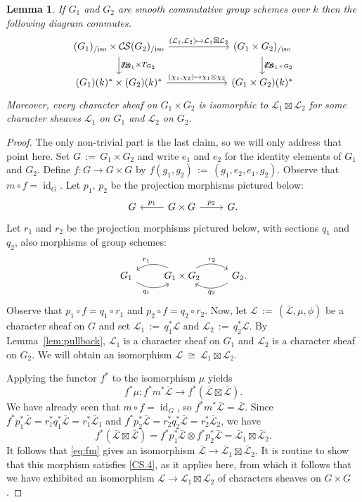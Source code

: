 \documentclass[10pt]{amsart}
\theoremstyle{plain}
\newtheorem{lemma}[theorem]{Lemma}
\theoremstyle{definition}
\newcommand{\Fq}{k}
\DeclareMathOperator{\id}{id}
\newcommand{\ceq}{{\, :=\, }}
\newcommand{\iso}{{\ \cong\ }}
\newcommand{\TrFrob}[1]{T_{#1}}
\newcommand{\cs}[1]{{\mathcal{#1}}}
\newcommand{\gcs}[1]{{\mathcal{\bar #1}}}
\newcommand{\CS}{{\mathcal{C\hskip-0.8pt S}}}
\newcommand{\CSiso}[1]{\CS(#1)_{/\text{iso}}}
\begin{document}
\begin{lemma}\label{lem:product}
If $G_1$ and $G_2$ are smooth commutative group schemes over $\Fq$ then the following diagram commutes.
\[
\begin{tikzcd}[column sep=60]
\arrow{d}{\TrFrob{G_1} \times \TrFrob{G_2}} \CSiso{G_1}\times \CSiso{G_2} \arrow{r}{(\cs{L}_1,\cs{L}_2)\mapsto \cs{L}_1\boxtimes \cs{L}_2}
& \arrow{d}{\TrFrob{G_1\times G_2}} \CSiso{G_1\times G_2}\\
(G_1)(\Fq)^*\times (G_2)(\Fq)^* \arrow{r}{(\chi_1,\chi_2)\mapsto \chi_1\otimes \chi_2}  & (G_1\times G_2)(\Fq)^*
\end{tikzcd}
\]
Moreover, every character sheaf on $G_1\times G_2$ is isomorphic to $\cs{L}_1\boxtimes\cs{L}_2$ for some character sheaves $\cs{L}_1$ on $G_1$ and $\cs{L}_2$ on $G_2$.
\end{lemma}
\begin{proof}
The only non-trivial part is the last claim, so we will only address that point here.
%
Set $G \ceq G_1\times G_2$
and write $e_1$ and $e_2$ for the identity elements of $G_1$ and $G_2$.
Define $f : G\to G\times G$ by $f(g_1,g_2) \ceq (g_1,e_2,e_1,g_2)$.
Observe that $m\circ f = \id_G$.
Let $p_1$, $p_2$ be the projection morphisms pictured below:
\[
\begin{tikzcd}
G & \arrow[swap]{l}{p_1} G\times G \arrow{r}{p_2} & G.
\end{tikzcd}
\]
Let $r_1$ and $r_2$ be the projection morphisms pictured below,
with sections $q_1$ and $q_2$, also morphisms of group schemes:
\[
\begin{tikzcd}
G_1  \arrow[swap, bend right]{r}{q_1} &
\arrow[swap, bend right]{l}{r_1} G_1\times G_2 \arrow[bend left]{r}{r_2} &
\arrow[bend left]{l}{q_2} G_2.
\end{tikzcd}
\]
Observe that $p_1\circ f = q_1 \circ r_1$ and $p_2 \circ f = q_2\circ r_2$.
%
Now, let $\cs{L} \ceq (\gcs{L},\mu,\phi)$ be a character sheaf on $G$
and set $\cs{L}_1 \ceq q_1^* \cs{L}$ and $\cs{L}_2 \ceq q_2^* \cs{L}$.
By Lemma~\ref{lem:pullback}, $\cs{L}_1$ is a character sheaf on $G_1$
and $\cs{L}_2$ is a character sheaf on $G_2$.
We will obtain an isomorphism $\cs{L} \iso  \cs{L}_1\boxtimes \cs{L}_2$.

Applying the functor $f^*$ to the isomorphism $\mu$ yields
\begin{equation}\label{eq:fm}
f^*\mu : f^* m^* \gcs{L} \to f^*(\gcs{L}\boxtimes \gcs{L}) .
\end{equation}
We have already seen that $m\circ f = \id_G$, so $f^* m^* \gcs{L} = \gcs{L}$.  
Since $f^*p_1^*\gcs{L} = r_1^* q_1^* \gcs{L} = r_1^* \gcs{L}_1$ and $f^*p_2^*\gcs{L} = r_2^* q_2^* \gcs{L} = r_2^*\gcs{L}_2$,
we have 
\[
f^*(\gcs{L}\boxtimes \gcs{L})  = f^*p_1^*\gcs{L}\otimes f^* p_2^*\gcs{L} = \gcs{L}_1\boxtimes \gcs{L}_2.
\]
It follows that \eqref{eq:fm} gives an isomorphism $\gcs{L} \to  \gcs{L}_1\boxtimes \gcs{L}_2$.
It is routine to show that this morphism satisfies
\ref{CS.4}, as it applies here,
from which it follows that we have exhibited an isomorphism
$\cs{L} \to \cs{L}_1\boxtimes \cs{L}_2$ of characters sheaves on $G\times G$.
\end{proof}
\end{document}
